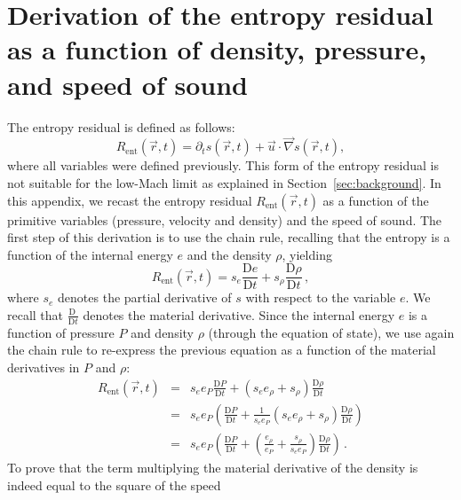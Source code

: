 \documentclass[review,10pt]{elsarticle}
\newcommand{\grad}{\vec{\nabla}}
\newcommand{\resi}{R_\text{ent}}
\newcommand{\matder}[1]{\frac{\textrm{D} #1}{\textrm{D} t}}
\newcommand{\sct}[1]{Section~\ref{#1}}                   %
\begin{document}
\section{Derivation of the entropy residual as a function of density, pressure, and speed of sound} \label{app:ent_res}

The entropy residual is defined as follows:
%
\begin{equation*}
\resi(\vec{r},t) = \partial_t s (\vec{r},t) + \vec{u} \cdot \grad s (\vec{r},t) ,
\end{equation*}
%
where all variables were defined previously. This form of the entropy residual is not suitable for the low-Mach 
limit as explained in \sct{sec:background}. In this appendix, we recast the entropy residual $\resi(\vec{r},t)$ 
as a function of the primitive variables (pressure, velocity and density) and the speed of sound. The first step 
of this derivation is to use the chain rule, recalling that the entropy is a function of the internal energy $e$ 
and the density $\rho$, yielding
%
\begin{equation*}
\resi(\vec{r},t) = s_e  \matder{e} + s_{\rho}  \matder{\rho} \,,
\end{equation*}
%
where $s_e$ denotes the partial derivative of $s$ with respect to the variable $e$. We recall that $\matder{\ }$ 
denotes the material derivative. Since the internal energy $e$ is a function of pressure $P$ and density $\rho$ 
(through the equation of state), we use again the chain rule to re-express the previous equation as a function 
of the material derivatives in $P$ and $\rho$:
%
\begin{eqnarray*}
\resi(\vec{r},t) &=&  s_e e_P \matder{P} + ( s_e e_{\rho} + s_{\rho} ) \matder{\rho} \\
&=& s_e e_P \left( \matder{P} + \frac{1}{s_e e_P} ( s_e e_{\rho} + s_{\rho} )  \matder{\rho}\right) \\
&=& s_e e_P \left( \matder{P} + ( \frac{e_{\rho}}{e_P} + \frac{s_{\rho}}{s_e e_P} )  \matder{\rho} \right) \,.
\end{eqnarray*}
%
To prove that the term multiplying the material derivative of the density is indeed equal to the square of the speed 
\end{document}
